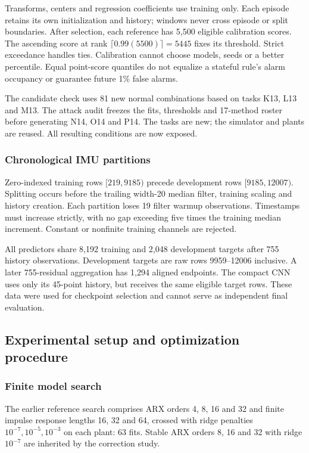 Transforms, centers and regression coefficients use training only. Each episode retains its own initialization and history; windows never cross episode or split boundaries. After selection, each reference has 5,500 eligible calibration scores. The ascending score at rank $\lceil0.99(5500)\rceil=5445$ fixes its threshold. Strict exceedance handles ties. Calibration cannot choose models, seeds or a better percentile. Equal point-score quantiles do not equalize a stateful rule's alarm occupancy or guarantee future 1\% false alarms.

The candidate check uses 81 new normal combinations based on tasks K13, L13 and M13. The attack audit freezes the fits, thresholds and 17-method roster before generating N14, O14 and P14. The tasks are new; the simulator and plants are reused. All resulting conditions are now exposed.

\subsubsection{Chronological IMU partitions}
Zero-indexed training rows $[219,9185)$ precede development rows $[9185,12007)$. Splitting occurs before the trailing width-20 median filter, training scaling and history creation. Each partition loses 19 filter warmup observations. Timestamps must increase strictly, with no gap exceeding five times the training median increment. Constant or nonfinite training channels are rejected.

All predictors share 8,192 training and 2,048 development targets after 755 history observations. Development targets are raw rows 9959--12006 inclusive. A later 755-residual aggregation has 1,294 aligned endpoints. The compact CNN uses only its 45-point history, but receives the same eligible target rows. These data were used for checkpoint selection and cannot serve as independent final evaluation.

\subsection{Experimental setup and optimization procedure}
\subsubsection{Finite model search}
The earlier reference search comprises ARX orders 4, 8, 16 and 32 and finite impulse response lengths 16, 32 and 64, crossed with ridge penalties $10^{-7},10^{-5},10^{-3}$ on each plant: 63 fits. Stable ARX orders 8, 16 and 32 with ridge $10^{-7}$ are inherited by the correction study.

